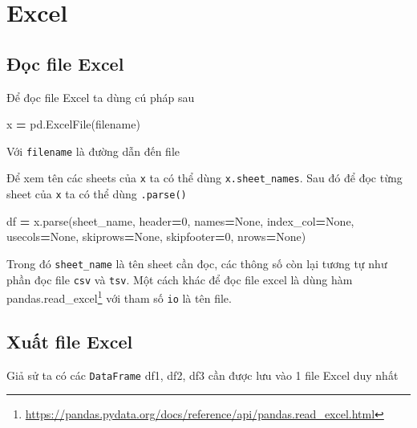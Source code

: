 \documentclass[
]{book}
\newenvironment{Shaded}{\begin{snugshade}}{\end{snugshade}}
\newcommand{\DecValTok}[1]{\textcolor[rgb]{0.00,0.00,0.81}{#1}}
\newcommand{\NormalTok}[1]{#1}
\newcommand{\OperatorTok}[1]{\textcolor[rgb]{0.81,0.36,0.00}{\textbf{#1}}}
\newcommand{\VariableTok}[1]{\textcolor[rgb]{0.00,0.00,0.00}{#1}}
\renewcommand{\href}[2]{#2\footnote{\url{#1}}}
\begin{document}
\section{Excel}\label{excel}

\subsection{Đọc file Excel}\label{ux111ux1ecdc-file-excel}

Để đọc file Excel ta dùng cú pháp sau

\begin{Shaded}
\begin{Highlighting}[]
\NormalTok{x }\OperatorTok{=}\NormalTok{ pd.ExcelFile(filename)}
\end{Highlighting}
\end{Shaded}

Với \texttt{filename} là đường dẫn đến file

Để xem tên các sheets của \texttt{x} ta có thể dùng \texttt{x.sheet\_names}. Sau đó để đọc từng sheet của \texttt{x} ta có thể dùng \texttt{.parse()}

\begin{Shaded}
\begin{Highlighting}[]
\NormalTok{df }\OperatorTok{=}\NormalTok{ x.parse(sheet\_name, header}\OperatorTok{=}\DecValTok{0}\NormalTok{, names}\OperatorTok{=}\VariableTok{None}\NormalTok{, index\_col}\OperatorTok{=}\VariableTok{None}\NormalTok{, usecols}\OperatorTok{=}\VariableTok{None}\NormalTok{, skiprows}\OperatorTok{=}\VariableTok{None}\NormalTok{, skipfooter}\OperatorTok{=}\DecValTok{0}\NormalTok{, nrows}\OperatorTok{=}\VariableTok{None}\NormalTok{)}
\end{Highlighting}
\end{Shaded}

Trong đó \texttt{sheet\_name} là tên sheet cần đọc, các thông số còn lại tương tự như phần đọc file \texttt{csv} và \texttt{tsv}. Một cách khác để đọc file excel là dùng hàm \href{https://pandas.pydata.org/docs/reference/api/pandas.read_excel.html}{pandas.read\_excel} với tham số \texttt{io} là tên file.

\subsection{Xuất file Excel}\label{xuux1ea5t-file-excel}

Giả sử ta có các \texttt{DataFrame} df1, df2, df3 cần được lưu vào 1 file Excel duy nhất
\end{document}
